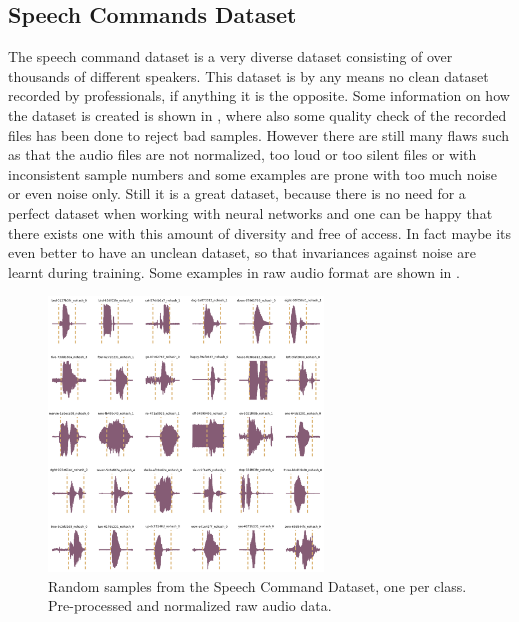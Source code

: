 
\subsection{Speech Commands Dataset}\label{sec:exp_dataset_speech_cmd}
The speech command dataset \cite{Warden2018} is a very diverse dataset consisting of over thousands of different speakers. This dataset is by any means no clean dataset recorded by professionals, if anything it is the opposite.
Some information on how the dataset is created is shown in \cite{Warden2018}, where also some quality check of the recorded files has been done to reject bad samples.
However there are still many flaws such as that the audio files are not normalized, too loud or too silent files or with inconsistent sample numbers and some examples are prone with too much noise or even noise only.
Still it is a great dataset, because there is no need for a perfect dataset when working with neural networks and one can be happy that there exists one with this amount of diversity and free of access.
In fact maybe its even better to have an unclean dataset, so that invariances against noise are learnt during training.
Some examples in raw audio format are shown in .
\begin{figure}[!ht]
  \centering
    \includegraphics[width=0.65\textwidth]{./5_exp/figs/exp_dataset_wav_grid_c30}
  \caption{Random samples from the Speech Command Dataset, one per class. Pre-processed and normalized raw audio data.}
  \label{fig:exp_dataset_wav_grid_c30}
\end{figure}
\FloatBarrier
\noindent

